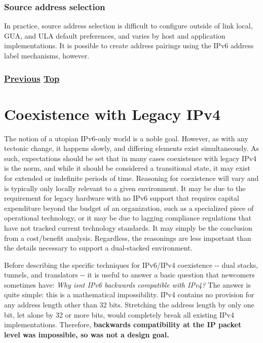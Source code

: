 \documentclass[
]{article}
\begin{document}
\subsubsection{Source address selection}\label{source-address-selection}

In practice, source address selection is difficult to configure outside
of link local, GUA, and ULA default preferences, and varies by host and
application implementations. It is possible to create address pairings
using the IPv6 address label mechanisms, however.

\subsubsection{\texorpdfstring{\hyperref[traffic-class-and-flow-label]{Previous}
\hyperref[ipv6-basic-technology]{Top}}{Previous Top}}\label{previous-top-1}

\pagebreak

\section{Coexistence with Legacy
IPv4}\label{coexistence-with-legacy-ipv4}

The notion of a utopian IPv6-only world is a noble goal. However, as
with any tectonic change, it happens slowly, and differing elements
exist simultaneously. As such, expectations should be set that in many
cases coexistence with legacy IPv4 is the norm, and while it should be
considered a transitional state, it may exist for extended or indefinite
periods of time. Reasoning for coexistence will vary and is typically
only locally relevant to a given environment. It may be due to the
requirement for legacy hardware with no IPv6 support that requires
capital expenditure beyond the budget of an organization, such as a
specialized piece of operational technology, or it may be due to lagging
compliance regulations that have not tracked current technology
standards. It may simply be the conclusion from a cost/benefit analysis.
Regardless, the reasonings are less important than the details necessary
to support a dual-stacked environment.

Before describing the specific techniques for IPv6/IPv4 coexistence -\/-
dual stacks, tunnels, and translators -\/- it is useful to answer a
basic question that newcomers sometimes have: \emph{Why
isn\textquotesingle t IPv6 backwards compatible with IPv4?} The answer
is quite simple: this is a mathematical impossibility. IPv4 contains no
provision for any address length other than 32 bits. Stretching the
address length by only one bit, let alone by 32 or more bits, would
completely break all existing IPv4 implementations. Therefore,
\textbf{backwards compatibility at the IP packet level was impossible,
so was not a design goal.}
\end{document}
